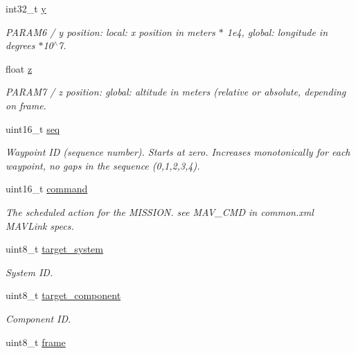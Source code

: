 \begin{DoxyCompactItemize}
int32\+\_\+t \hyperlink{struct____mavlink__mission__item__int__t_a4fcf0d3040a83cbe42d4f9e4d2137a4b}{y}
\begin{DoxyCompactList}\small\item\em P\+A\+R\+A\+M6 / y position\+: local\+: x position in meters $\ast$ 1e4, global\+: longitude in degrees $\ast$10$^\wedge$7. \end{DoxyCompactList}\item 
float \hyperlink{struct____mavlink__mission__item__int__t_a11bf93cf254a0f5178c7f9a422657857}{z}
\begin{DoxyCompactList}\small\item\em P\+A\+R\+A\+M7 / z position\+: global\+: altitude in meters (relative or absolute, depending on frame. \end{DoxyCompactList}\item 
uint16\+\_\+t \hyperlink{struct____mavlink__mission__item__int__t_a39fff7ff91575a05c79c2228b4f2531a}{seq}
\begin{DoxyCompactList}\small\item\em Waypoint I\+D (sequence number). Starts at zero. Increases monotonically for each waypoint, no gaps in the sequence (0,1,2,3,4). \end{DoxyCompactList}\item 
uint16\+\_\+t \hyperlink{struct____mavlink__mission__item__int__t_a9a64fb49961faafbb59ebee26ab2d095}{command}
\begin{DoxyCompactList}\small\item\em The scheduled action for the M\+I\+S\+S\+I\+O\+N. see M\+A\+V\+\_\+\+C\+M\+D in common.\+xml M\+A\+V\+Link specs. \end{DoxyCompactList}\item 
uint8\+\_\+t \hyperlink{struct____mavlink__mission__item__int__t_aed52ddfacceede1c089bfff6a57aaa97}{target\+\_\+system}
\begin{DoxyCompactList}\small\item\em System I\+D. \end{DoxyCompactList}\item 
uint8\+\_\+t \hyperlink{struct____mavlink__mission__item__int__t_a5dea69c24977117f7329db125f7b3c44}{target\+\_\+component}
\begin{DoxyCompactList}\small\item\em Component I\+D. \end{DoxyCompactList}\item 
uint8\+\_\+t \hyperlink{struct____mavlink__mission__item__int__t_aa409967cb161418a0b4919680ba8653c}{frame}

\end{DoxyCompactItemize}
